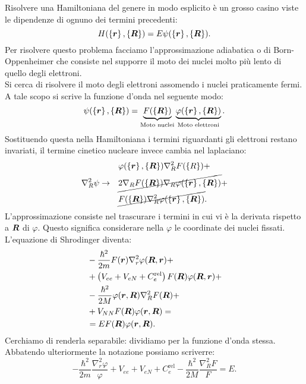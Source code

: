 Risolvere una Hamiltoniana del genere in modo esplicito è un grosso casino viste le dipendenze di ognuno dei termini precedenti:
\[
	H(\left\{ \boldsymbol{r} \right\}, \left\{ \boldsymbol{R} \right\})
	=
	E \psi(\left\{ \boldsymbol{r} \right\} , \left\{ \boldsymbol{R} \right\} )
.\] 
Per risolvere questo problema facciamo l'approssimazione adiabatica o di Born-Oppenheimer che consiste nel supporre il moto dei nuclei molto più lento di quello degli elettroni. \\
Si cerca di risolvere il moto degli elettroni assomendo i nuclei praticamente fermi.\\
A tale scopo si scrive la funzione d'onda nel seguente modo:
\[
	\psi(\left\{ \boldsymbol{r} \right\}, \left\{ \boldsymbol{R} \right\} )
	=
	\underbrace{F(\left\{ \boldsymbol{R} \right\})}_
	{\substack{\text{Moto nuclei}}}
	\underbrace{\varphi(\left\{\boldsymbol{r}\right\},\left\{\boldsymbol{R}\right\} )}_
	{\substack{\text{Moto elettroni}}}
.\] 
Sostituendo questa nella Hamiltoniana i termini riguardanti gli elettroni restano invariati, il termine cinetico nucleare invece cambia nel laplaciano:
\[\begin{aligned}
& 			&		&\varphi(\left\{ \boldsymbol{r} \right\}, \left\{ \boldsymbol{R} \right\})\nabla^2_R F(\left\{ R \right\} ) +\\
\nabla^2_R \psi&\to 	& 		&\cancel{2\nabla_RF(\left\{ \boldsymbol{R} \right\})\nabla_R\varphi(\left\{ \boldsymbol{r} \right\},\left\{ \boldsymbol{R} \right\} )}+\\
&			&		&\cancel{F(\left\{ \boldsymbol{R} \right\} )\nabla_R^2\varphi(\left\{ \boldsymbol{r} \right\},\left\{ \boldsymbol{R} \right\} )}
.\end{aligned}\]
L'approssimazione consiste nel trascurare i termini in cui vi è la derivata rispetto a $\boldsymbol{R}$ di $\varphi$. Questo significa considerare nella $\varphi$ le coordinate dei nuclei fissati.\\
L'equazione di Shrodinger diventa:
\[\begin{aligned}
	&-\frac{\hbar ^2}{2m}F(\boldsymbol{r})\nabla _r^2\varphi(\boldsymbol{R},\boldsymbol{r}) +\\
	&+\left( V_{ee} + V_{eN} + C_e^{\text{rel}} \right)
	F(\boldsymbol{R})\varphi(\boldsymbol{R},\boldsymbol{r})+\\
	&- \frac{\hbar ^2}{2M}\varphi(\boldsymbol{r},\boldsymbol{R})\nabla_R^2F(\boldsymbol{R}) +\\
	&+V_{NN}F(\boldsymbol{R})\varphi(\boldsymbol{r},\boldsymbol{R}) =\\
	&=EF(\boldsymbol{R})\varphi(\boldsymbol{r},\boldsymbol{R})
.\end{aligned}\]
Cerchiamo di renderla separabile: dividiamo per la funzione d'onda stessa. Abbatendo ulteriormente la notazione possiamo scriverre:
\[
	-\frac{\hbar ^2}{2m}\frac{\nabla_r^2\varphi}{\varphi} +
	V_{ee} + V _{eN} + C_e^{\text{rel}} -
	\frac{\hbar ^2}{2M}\frac{\nabla_R^2F}{F} = E
.\] 
